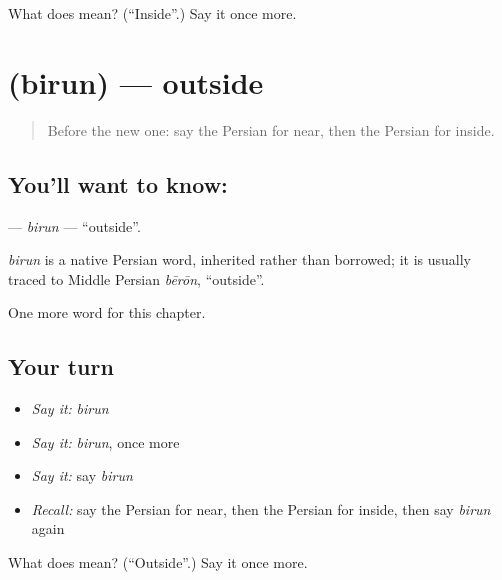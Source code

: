 \begin{tcolorbox}[breakable,colback=teal!4,colframe=teal!35!black,title={Before you move on}]
What does  mean? (\textquotedblleft{}Inside\textquotedblright{}.) Say it once more.
\end{tcolorbox}
\section[\texorpdfstring{\fa{بیرون} (birun)}{بیرون (birun)}]{ (birun) — outside}

\label{lesson:FA-C68-birun}



\begin{quote}
Before the new one: say the Persian for near, then the Persian for inside.
\end{quote}

\subsection*{You'll want to know: }
\textbf{} — \emph{birun} — \textquotedblleft{}outside\textquotedblright{}.

\begin{cousinweb}
\emph{birun} is a native Persian word, inherited rather than borrowed; it is usually traced to Middle Persian \emph{bērōn}, \textquotedblleft{}outside\textquotedblright{}.
\end{cousinweb}

\begin{grammarlens}[title={What you've built}]
One more word for this chapter.
\end{grammarlens}

\subsection*{Your turn}
\begin{itemize}
\raggedright
  \item \emph{Say it:} \emph{birun}
  \item \emph{Say it:} \emph{birun}, once more
  \item \emph{Say it:} say \emph{birun}
  \item \emph{Recall:} say the Persian for near, then the Persian for inside, then say \emph{birun} again
\end{itemize}

\begin{tcolorbox}[breakable,colback=teal!4,colframe=teal!35!black,title={Before you move on}]
What does  mean? (\textquotedblleft{}Outside\textquotedblright{}.) Say it once more.
\end{tcolorbox}
